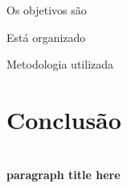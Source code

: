 \documentclass[a4paper,12pt]{article}
\begin{document}
\pagebreak
Os objetivos são

Está organizado 

Metodologia utilizada

\section{Conclusão}


\section{}
\subsection{}
\subsubsection{}

\paragraph{paragraph title here}
\end{document}

